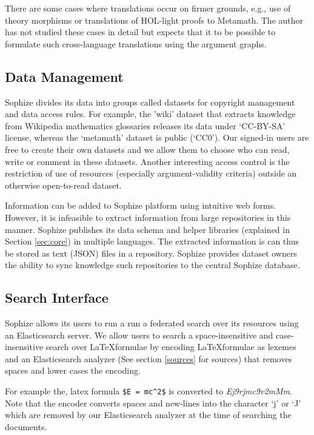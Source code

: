 \documentclass[runningheads]{llncs}
\begin{document}
There are some cases where translations occur on firmer grounds, e.g., use of theory morphisms or translations of HOL-light proofs to Metamath. The author has not studied these cases in detail but expects that it to be possible to formulate such cross-language translations using the argument graphs.

\subsection{Data Management}

Sophize divides its data into groups called datasets for copyright management and data access rules. For example, the 'wiki' dataset that extracts knowledge from Wikipedia mathematics glossaries releases its data under `CC-BY-SA' license, whereas the `metamath' dataset is public (`CC0'). Our signed-in users are free to create their own datasets and we allow them to choose who can read, write or comment in these datasets. Another interesting access control is the restriction of use of resources (especially argument-validity criteria) outside an otherwise open-to-read dataset.

Information can be added to Sophize platform using intuitive web forms. However, it is infeasible to extract information from large repositories in this manner. Sophize publishes its data schema and helper libraries (explained in Section \ref{sec:core}) in multiple languages. The extracted information is can thus be stored as text (JSON) files in a repository. Sophize provides dataset owners the ability to sync knowledge such repositories to the central Sophize database.

\subsection{Search Interface}
Sophize allows its users to run a run a federated search over its resources using an Elasticsearch server. We allow users to search a space-insensitive and case-insensitive search over \LaTeX\space formulae by encoding \LaTeX\space formulae as lexemes and an Elasticsearch analyzer (See section \ref{sources} for sources) that removes spaces and lower cases the encoding.

For example the, latex formula \verb+$E = mc^2$+ is converted to \textit{Ej9rjmc9v2mMm}. 
Note that the encoder converts spaces and new-lines into the character `j' or `J' which are removed by our Elasticsearch analyzer at the time of searching the documents.
\end{document}
